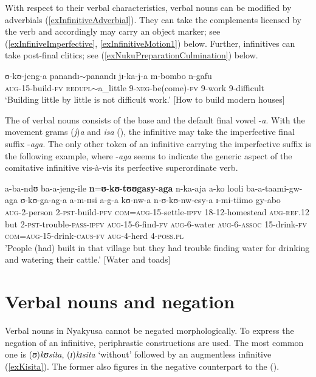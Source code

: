 With respect to their verbal characteristics, verbal nouns can be modified by adverbials (\ref{exInfinitiveAdverbial}). They can take the complements licensed by the verb  and accordingly may carry an object marker; see (\ref{exInfiniveImperfective}, \ref{exInfinitiveMotion1}) below. Further, infinitives can take post-final clitics; see (\ref{exNukuPreparationCulmination}) below.

\begin{exe}
\ex \label{exInfinitiveAdverbial}\gll ʊ-kʊ-jeng-a panandɪ$\sim$panandɪ jɪ-ka-j-a m-bombo n-gafu\\
\textsc{aug}-15-build-\textsc{fv} \textsc{redupl}$\sim$a\_little 9-\textsc{neg}-be(come)-\textsc{fv} 9-work 9-difficult\\ 
\glt `Building little by little is not difficult work.' [How to build modern houses]
\end{exe}

The  of verbal nouns consists of the base and the default final vowel -\textit{a}. With the movement grams (\textit{j})\textit{a} and \textit{isa} (), the infinitive may take the imperfective final suffix \mbox{-\textit{aga}}. The only other token of an infinitive carrying the imperfective suffix is the following example, where -\textit{aga} seems to indicate the generic aspect of the comitative infinitive vis-à-vis its perfective superordinate verb.
\begin{exe}
\ex \label{exInfiniveImperfective} \gll a-ba-ndʊ ba-a-jeng-ile \textbf{n}=\textbf{ʊ}-\textbf{kʊ}-\textbf{tʊʊgasy}-\textbf{aga} n-ka-aja a-ko looli ba-a-taami-gw-aga ʊ-kʊ-ga-ag-a a-m-ɪɪsi a-g-a kʊ-nw-a n-ʊ-kʊ-nw-esy-a ɪ-mi-tiimo gy-abo\\ 
\textsc{aug}-2-person 2-\textsc{pst}-build-\textsc{pfv} \textsc{com}=\textsc{aug}-15-settle-\textsc{ipfv} 18-12-homestead \textsc{aug}-\textsc{ref.12} but 2-\textsc{pst}-trouble-\textsc{pass}-\textsc{ipfv} \textsc{aug}-15-6-find-\textsc{fv} \textsc{aug}-6-water \textsc{aug}-6-\textsc{assoc} 15-drink-\textsc{fv} \textsc{com}=\textsc{aug}-15-drink-\textsc{caus}-\textsc{fv} \textsc{aug}-4-herd 4-\textsc{poss.pl}\\
\glt 'People (had) built in that village but they had trouble finding water for drinking and watering their cattle.' [Water and toads]
\end{exe}
\section{Verbal nouns and negation}\label{VerbalNounsNegation}
Verbal nouns in Nyakyusa cannot be negated morphologically. To express the negation of an infinitive, periphrastic constructions are used. The most common one is (\textit{ʊ})\textit{kʊsita}, (\textit{ɪ})\textit{kɪsita} `without' followed by an augmentless infinitive (\ref{exKisita}). The former also figures in the negative counterpart to the ().

